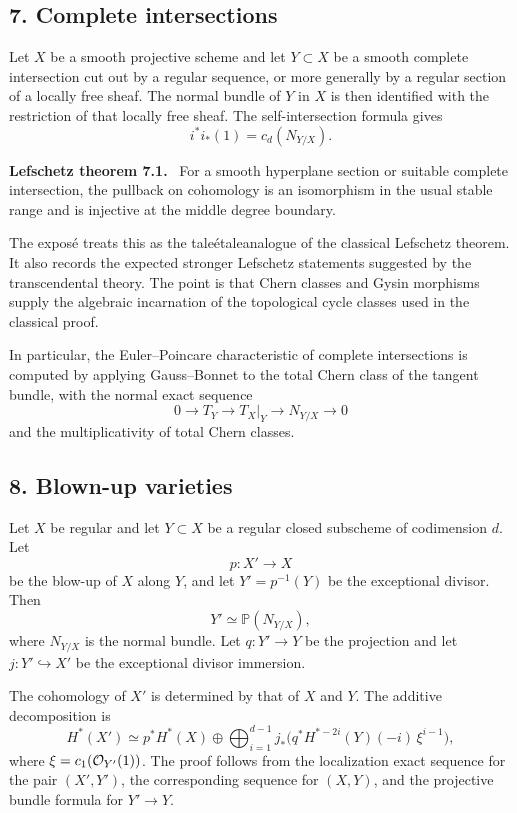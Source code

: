 \documentclass[11pt]{article}
\theoremstyle{plain}
\theoremstyle{definition}
\theoremstyle{remark}
\newenvironment{statement}[1]{\par\medskip\noindent\textbf{#1.}\ }{\par\medskip}
\providecommand{\etale}{\ifmmode\acute{e}tale\else \'etale\fi}
\begin{document}
\subsection*{7. Complete intersections}

Let $X$ be a smooth projective scheme and let $Y\subset X$ be a smooth complete intersection cut out by a regular sequence, or more generally by a regular section of a locally free sheaf. The normal bundle of $Y$ in $X$ is then identified with the restriction of that locally free sheaf. The self-intersection formula gives
\[
   i^*i_*(1)=c_d(N_{Y/X}).
\]

\begin{statement}{Lefschetz theorem 7.1}
For a smooth hyperplane section or suitable complete intersection, the pullback on cohomology is an isomorphism in the usual stable range and is injective at the middle degree boundary.
\end{statement}

The expos\'e treats this as the \etale analogue of the classical Lefschetz theorem. It also records the expected stronger Lefschetz statements suggested by the transcendental theory. The point is that Chern classes and Gysin morphisms supply the algebraic incarnation of the topological cycle classes used in the classical proof.

In particular, the Euler--Poincare characteristic of complete intersections is computed by applying Gauss--Bonnet to the total Chern class of the tangent bundle, with the normal exact sequence
\[
   0\to T_Y\to T_X|_Y\to N_{Y/X}\to0
\]
and the multiplicativity of total Chern classes.

\subsection*{8. Blown-up varieties}

Let $X$ be regular and let $Y\subset X$ be a regular closed subscheme of codimension $d$. Let
\[
   p:X'\to X
\]
be the blow-up of $X$ along $Y$, and let $Y'=p^{-1}(Y)$ be the exceptional divisor. Then
\[
   Y'\simeq \mathbb P(N_{Y/X}),
\]
where $N_{Y/X}$ is the normal bundle. Let $q:Y'\to Y$ be the projection and let $j:Y'\hookrightarrow X'$ be the exceptional divisor immersion.

The cohomology of $X'$ is determined by that of $X$ and $Y$. The additive decomposition is
\[
   H^*(X')\simeq p^*H^*(X)\oplus
      \bigoplus_{i=1}^{d-1} j_*\bigl(q^*H^{*-2i}(Y)(-i)\,\xi^{i-1}\bigr),
\]
where $\xi=c_1(\mathcal O_{Y'}(1))$. The proof follows from the localization exact sequence for the pair $(X',Y')$, the corresponding sequence for $(X,Y)$, and the projective bundle formula for $Y'\to Y$.
\end{document}
